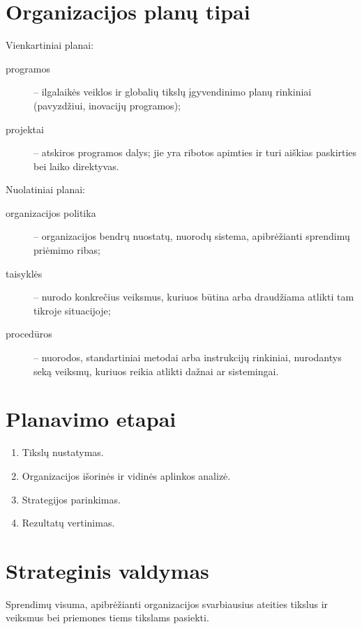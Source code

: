 \section{Organizacijos planų tipai}

Vienkartiniai planai:
\begin{description}
  \item[programos] – ilgalaikės veiklos ir globalių tikslų įgyvendinimo
    planų rinkiniai (pavyzdžiui, inovacijų programos);
  \item[projektai] – atskiros programos dalys; jie yra ribotos apimties
    ir turi aiškias paskirties bei laiko direktyvas.
\end{description}

Nuolatiniai planai:
\begin{description}
  \item[organizacijos politika] – organizacijos bendrų nuostatų, nuorodų
    sistema, apibrėžianti sprendimų priėmimo ribas;
  \item[taisyklės] – nurodo konkrečius veiksmus, kuriuos būtina arba
    draudžiama atlikti tam tikroje situacijoje;
  \item[procedūros] – nuorodos, standartiniai metodai arba instrukcijų
    rinkiniai, nurodantys seką veiksmų, kuriuos reikia atlikti dažnai
    ar sistemingai.
\end{description}

\section{Planavimo etapai}

\begin{enumerate}
  \item Tikslų nustatymas.
  \item Organizacijos išorinės ir vidinės aplinkos analizė.
  \item Strategijos parinkimas.
  \item Rezultatų vertinimas.
\end{enumerate}

\section{Strateginis valdymas}

\begin{defn}[Strategija]
  Sprendimų visuma, apibrėžianti organizacijos svarbiausius ateities
  tikslus ir veiksmus bei priemones tiems tikslams pasiekti.
\end{defn}

